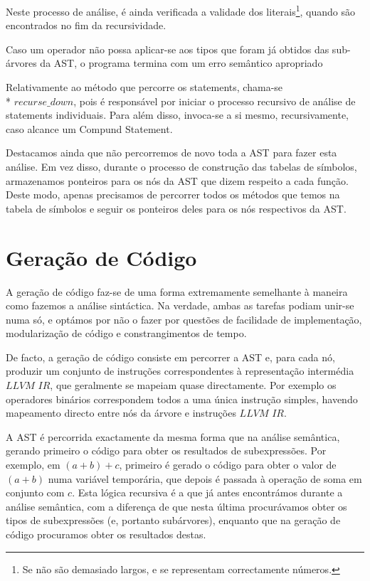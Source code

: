 \documentclass[11pt,a4paper]{article}
\begin{document}
	Neste processo de análise, é ainda verificada a validade dos literais\footnote{Se não são demasiado largos, e se representam correctamente números.}, quando são encontrados no fim da recursividade.
	
	Caso um operador não possa aplicar-se aos tipos que foram já obtidos das sub-árvores da AST, o programa termina com um erro semântico apropriado
	
	Relativamente ao método que percorre os statements, chama-se \\* $recurse\_down$, pois é responsável por iniciar o processo recursivo de análise de statements individuais. Para além disso, invoca-se a si mesmo, recursivamente, caso alcance um Compund Statement.
	
	Destacamos ainda que não percorremos de novo toda a AST para fazer esta análise. Em vez disso, durante o processo de construção das tabelas de símbolos, armazenamos ponteiros para os nós da AST que dizem respeito a cada função. Deste modo, apenas precisamos de percorrer todos os métodos que temos na tabela de símbolos e seguir os ponteiros deles para os nós respectivos da AST.
	
	\pagebreak
	
\section{Geração de Código}

A geração de código faz-se de uma forma extremamente semelhante à maneira como fazemos a análise sintáctica. Na verdade, ambas as tarefas podiam unir-se numa só, e optámos por não o fazer por questões de facilidade de implementação, modularização de código e constrangimentos de tempo.

De facto, a geração de código consiste em percorrer a AST e, para cada nó, produzir um conjunto de instruções correspondentes à representação intermédia $LLVM$ $IR$, que geralmente se mapeiam quase directamente. Por exemplo os operadores binários correspondem todos a uma única instrução simples, havendo mapeamento directo entre nós da árvore e instruções $LLVM$ $IR$.

A AST é percorrida exactamente da mesma forma que na análise semântica, gerando primeiro o código para obter os resultados de subexpressões. Por exemplo, em $(a+b)+c$, primeiro é gerado o código para obter o valor de $(a+b)$ numa variável temporária, que depois é passada à operação de soma em conjunto com $c$. Esta lógica recursiva é a que já antes encontrámos durante a análise semântica, com a diferença de que nesta última procurávamos obter os tipos de subexpressões (e, portanto subárvores), enquanto que na geração de código procuramos obter os resultados destas.
\end{document}
